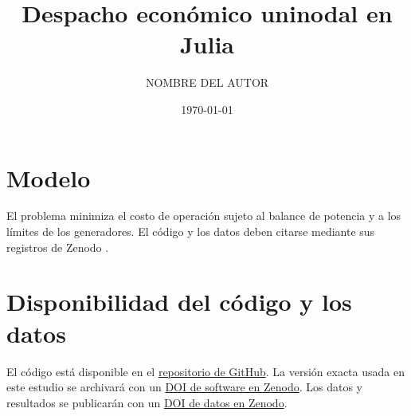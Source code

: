 \documentclass[11pt]{article}
\title{Despacho económico uninodal en Julia}
\author{NOMBRE DEL AUTOR}
\date{\today}
\begin{document}
\maketitle

\section{Modelo}
El problema minimiza el costo de operación sujeto al balance de potencia y a
los límites de los generadores. El código y los datos deben citarse mediante
sus registros de Zenodo \citep{softwareZenodo,datasetZenodo}.

\section{Disponibilidad del código y los datos}
El código está disponible en el
\href{https://github.com/USUARIO/despacho-economico-julia}{repositorio de GitHub}.
La versión exacta usada en este estudio se archivará con un
\href{https://doi.org/10.5281/zenodo.DOI_SOFTWARE}{DOI de software en Zenodo}.
Los datos y resultados se publicarán con un
\href{https://doi.org/10.5281/zenodo.DOI_DATOS}{DOI de datos en Zenodo}.


  {}
  {}
\end{document}

